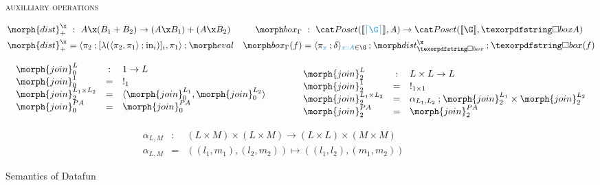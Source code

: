 \begin{figure*}
  \textsc{auxilliary operations}

  \begin{align*}
    \morph{dist}^\x_+ &~:~ A \x (B_1 + B_2) \to (A \x B_1) + (A \x B_2)
    &
    \mkbox_\Gamma &~:~ \Poset(\den{\stripcx \G}, A) \to \Poset(\den{\G}, \iso A) \\
    \morph{dist}^\x_+ &= \fork{\pi_2 \then \krof{\lambda (\fork{\pi_2,\pi_1} \then \injc_i)}_i, \pi_1}
    \then \eval
    &
    \mkbox_\Gamma(f) &= \fork{\pi_{\dvar x} \then \delta}_{\hd x A \in \G} \then \isox \then \iso(f)
  \end{align*}


  \begin{displaymath}
    \begin{array}{ll}
      \begin{array}{lcl }
        \morph{join}^{L}_0 & : & 1 \to L \\
        \morph{join}^1_0 & = & !_{1} \\ 
        \morph{join}^{L_1 \times L_2}_2 & = & \fork{\morph{join}^{L_1}_0, \morph{join}^{L_2}_0} \\ 
        \morph{join}^{\pfinof A}_0 & = & \morph{join}^{\pfinof A}_0 \\[1em]
      \end{array} 
      \qquad &
      \begin{array}{lcl}
        \morph{join}^{L}_2 & : & L \times L \to L \\
        \morph{join}^1_2 & = & !_{1 \times 1} \\ 
        \morph{join}^{L_1 \times L_2}_2 & = & \alpha_{L_1, L_2} \then \morph{join}^{L_1}_2 \times \morph{join}^{L_2}_2 \\
        \morph{join}^{\pfinof A}_2 & = & \morph{join}^{\pfinof A}_2 \\ 
      \end{array}
    \end{array}
  \end{displaymath}
  \begin{displaymath}
    \begin{array}{lcl}
      \alpha_{L,M} & : & (L \times M) \times (L \times M) \to (L \times L) \times (M \times M) \\ 
      \alpha_{L,M} & = & ((l_1, m_1), (l_2, m_2)) \mapsto ((l_1, l_2), (m_1, m_2)) 
    \end{array}
  \end{displaymath}

  \caption{Semantics of Datafun}
  \label{fig:semantics}\label{def:strip}
\end{figure*}
